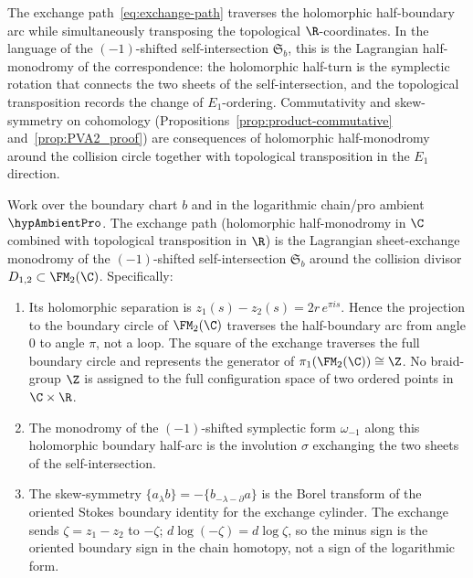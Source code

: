 \begin{remark}
\label{rem:exchange-symplectic-rotation}
The exchange path~\eqref{eq:exchange-path} traverses the holomorphic
half-boundary arc while simultaneously transposing the topological
$\R$-coordinates. In the
language of the $(-1)$-shifted self-intersection $\mathfrak{S}_b$, this is
the Lagrangian half-monodromy of the correspondence: the holomorphic
half-turn
is the symplectic rotation that connects the two sheets of the
self-intersection, and the topological transposition records the change
of $E_1$-ordering. Commutativity and skew-symmetry on cohomology
(Propositions~\ref{prop:product-commutative} and~\ref{prop:PVA2_proof}) are
consequences of holomorphic half-monodromy around the collision circle
together with topological transposition in the $E_1$ direction.
\end{remark}

\begin{proposition}
\label{prop:exchange-lagrangian-monodromy}
Work over the boundary chart \(b\) and in the logarithmic chain/pro
ambient \(\hypAmbientPro\).  The exchange path
\textup{(}holomorphic half-monodromy in $\C$ combined with
topological transposition in $\R$\textup{)} is the Lagrangian
sheet-exchange monodromy of the $(-1)$-shifted self-intersection\/
$\mathfrak{S}_b$ around the collision divisor\/
$D_{1,2} \subset \FM_2(\C)$. Specifically:
\begin{enumerate}[label=\textup{(\roman*)}]
\item Its holomorphic separation is
 \(z_1(s)-z_2(s)=2r\,e^{\pi i s}\).  Hence the projection to the
 boundary circle of \(\FM_2(\C)\) traverses the half-boundary arc
 from angle \(0\) to angle \(\pi\), not a loop.  The square of the
 exchange traverses the full boundary circle and represents the
 generator of \(\pi_1(\FM_2(\C))\cong\Z\).  No braid-group \(\Z\) is
 assigned to the full configuration space of two ordered points in
 \(\C\times\R\).
\item The monodromy of the $(-1)$-shifted symplectic form\/
 $\omega_{-1}$ along this holomorphic boundary half-arc is the
 involution $\sigma$ exchanging the two sheets of the
 self-intersection.
\item The skew-symmetry\/
 $\{a_\lambda b\} = -\{b_{-\lambda-\partial} a\}$ is the Borel
 transform of the oriented Stokes boundary identity for the exchange
 cylinder.  The exchange sends \(\zeta=z_1-z_2\) to \(-\zeta\);
 \(d\log(-\zeta)=d\log\zeta\), so the minus sign is the oriented
 boundary sign in the chain homotopy, not a sign of the logarithmic
 form.
\end{enumerate}
\end{proposition}

